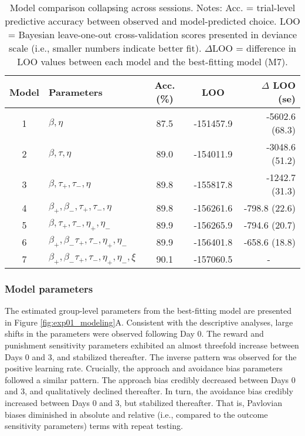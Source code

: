 \documentclass[a4paper,12pt]{article}
\begin{document}
\begin{refsection}[main]
\begin{table}[b!]
    \centering
    \begin{tabular}{clccr}
        \toprule
        Model & Parameters & Acc. (\%) & LOO & $\Delta$ LOO (se) \\
        \midrule
        1 & $\beta, \eta$ & 87.5 & -151457.9 & -5602.6 (68.3) \\
        2 & $\beta, \tau, \eta$ & 89.0 & -154011.9 & -3048.6 (51.2) \\
        3 & $\beta, \tau_+, \tau_-, \eta$ & 89.8 & -155817.8 & -1242.7 (31.3) \\
        4 & $\beta_+, \beta_-, \tau_+, \tau_-, \eta$ & 89.8 & -156261.6 & -798.8 (22.6) \\
        5 & $\beta, \tau_+, \tau_-, \eta_+, \eta_-$ & 89.9 & -156265.9 & -794.6 (20.7) \\
        6 & $\beta_+, \beta_- \tau_+, \tau_-, \eta_+, \eta_-$ & 89.9 & -156401.8 & -658.6 (18.8) \\
        7 & $\beta_+, \beta_- \tau_+, \tau_-, \eta_+, \eta_-, \xi$ & 90.1 & -157060.5 & \multicolumn{1}{c}{-} \\
        \bottomrule
\end{tabular}
    \caption{Model comparison collapsing across sessions. Notes: Acc. = trial-level predictive accuracy between observed and model-predicted choice. LOO = Bayesian leave-one-out cross-validation scores presented in deviance scale (i.e., smaller numbers indicate better fit). $\Delta$LOO = difference in LOO values between each model and the best-fitting model (M7).}
    \label{tab:exp1_mc_abbr}
\end{table}

\subsubsection*{Model parameters}

The estimated group-level parameters from the best-fitting model are presented in Figure \ref{fig:exp01_modeling}A. Consistent with the descriptive analyses, large shifts in the parameters were observed following Day 0. The reward and punishment sensitivity parameters exhibited an almost threefold increase between Days 0 and 3, and stabilized thereafter. The inverse pattern was observed for the positive learning rate. Crucially, the approach and avoidance bias parameters followed a similar pattern. The approach bias credibly decreased between Days 0 and 3, and qualitatively declined thereafter. In turn, the avoidance bias credibly increased between Days 0 and 3, but stabilized thereafter. That is, Pavlovian biases diminished in absolute and relative (i.e., compared to the outcome sensitivity parameters) terms with repeat testing. 


\end{refsection}
\end{document}
